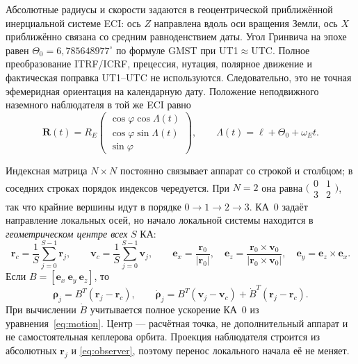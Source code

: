 \documentclass[a4paper,12pt]{article}
\begin{document}
Абсолютные радиусы и скорости задаются в геоцентрической
приближённой инерциальной системе ECI: ось $Z$ направлена вдоль оси
вращения Земли, ось $X$ приближённо связана со средним равноденствием
даты. Угол Гринвича на эпохе равен
$\Theta_0=6{,}785648977^\circ$ по формуле GMST при UT1$\approx$UTC.
Полное преобразование ITRF/ICRF, прецессия, нутация, полярное
движение и фактическая поправка UT1--UTC не используются.
Следовательно, это не точная эфемеридная ориентация на календарную дату.
Положение неподвижного наземного наблюдателя в той же ECI равно
\begin{equation}
 \mathbf R(t)=R_E
 \begin{pmatrix}
 \cos\varphi\cos\Lambda(t)\\
 \cos\varphi\sin\Lambda(t)\\
 \sin\varphi
 \end{pmatrix},\qquad
 \Lambda(t)=\ell+\Theta_0+\omega_E t.
 \label{eq:observer}
\end{equation}

Индексная матрица $N\times N$ постоянно связывает аппарат со строкой
и столбцом; в соседних строках порядок индексов чередуется.
При $N=2$ она равна $\bigl(\begin{smallmatrix}0&1\\3&2\end{smallmatrix}\bigr)$,
так что крайние вершины идут в порядке $0\!\to\!1\!\to\!2\!\to\!3$.
КА~0 задаёт направление локальных осей, но начало локальной системы
находится в \emph{геометрическом центре всех} $S$ КА:
\begin{equation}
 \mathbf r_c=\frac1S\sum_{j=0}^{S-1}\mathbf r_j,\qquad
 \mathbf v_c=\frac1S\sum_{j=0}^{S-1}\mathbf v_j,\qquad
 \mathbf e_x=\frac{\mathbf r_0}{|\mathbf r_0|},\quad
 \mathbf e_z=\frac{\mathbf r_0\times\mathbf v_0}
                       {|\mathbf r_0\times\mathbf v_0|},\quad
 \mathbf e_y=\mathbf e_z\times\mathbf e_x.
 \label{eq:center}
\end{equation}
Если $B=[\mathbf e_x\ \mathbf e_y\ \mathbf e_z]$, то
\begin{equation}
 \boldsymbol\rho_j=B^T(\mathbf r_j-\mathbf r_c),\qquad
 \dot{\boldsymbol\rho}_j=B^T(\mathbf v_j-\mathbf v_c)
                +\dot B^T(\mathbf r_j-\mathbf r_c).
 \label{eq:local}
\end{equation}
При вычислении $\dot B$ учитывается полное ускорение КА~0 из
уравнения~\eqref{eq:motion}. Центр --- расчётная точка, не
дополнительный аппарат и не самостоятельная кеплерова орбита.
Проекция наблюдателя строится из абсолютных $\mathbf r_j$ и
\eqref{eq:observer}, поэтому перенос локального начала её не меняет.
\end{document}
